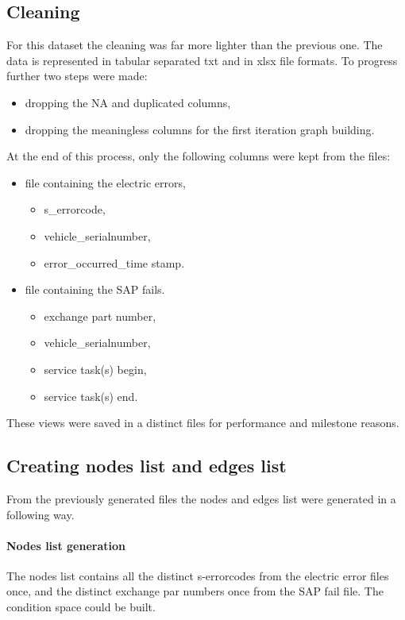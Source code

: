 	\subsection{Cleaning}
For this dataset the cleaning was far more lighter than the previous one. The data is represented in tabular separated txt and in xlsx file formats.
To progress further two steps were made:
\begin{itemize}
			\item{dropping the NA and duplicated columns,}
			\item{dropping the meaningless columns for the first iteration graph building.}
\end{itemize}

At the end of this process, only the following columns were kept from the files:
\begin{itemize}
			\item{file containing the electric errors,}
			\begin{itemize}
				\item{s\_errorcode,}
				\item{vehicle\_serialnumber,}
				\item{error\_occurred\_time stamp.}
			\end{itemize}
			\item{file containing the SAP fails.}
			\begin{itemize}
				\item{exchange part number,}
				\item{vehicle\_serialnumber,}
				\item{service task(s) begin,}
				\item{service task(s) end.}
			\end{itemize}
\end{itemize}
These views were saved in a distinct files for performance and milestone reasons.
	\subsection{Creating nodes list and edges list}
From the previously generated files the nodes and edges list were generated in a following way.
\paragraph{Nodes list generation}
The nodes list contains all the distinct s-errorcodes from the electric error files once, and the distinct exchange par numbers once from the SAP fail file. The condition space could be built.
